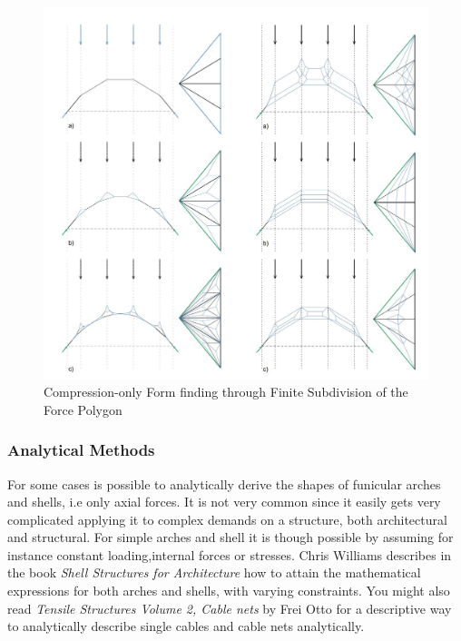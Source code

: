 \begin{figure}[H]
\centering
\includegraphics[width=0.6\linewidth ]{figure/Theory/graphStatEx.JPG}
\caption{Compression-only Form finding through Finite Subdivision of the
Force Polygon }
\end{figure}


\subsubsection{Analytical Methods}

For some cases is possible to analytically derive the shapes of funicular arches and shells, i.e only axial forces. It is not very common since it easily gets very complicated applying it to complex demands on a structure, both architectural and structural. For simple arches and shell it is though possible by assuming for instance constant loading,internal forces or stresses.  Chris Williams describes in the book \textit{Shell Structures for Architecture} how to attain the mathematical expressions for both arches and shells, with varying constraints.
You might also read \textit{ Tensile Structures Volume 2,  Cable nets} by Frei Otto for a descriptive way to analytically describe single cables and cable nets analytically. 

